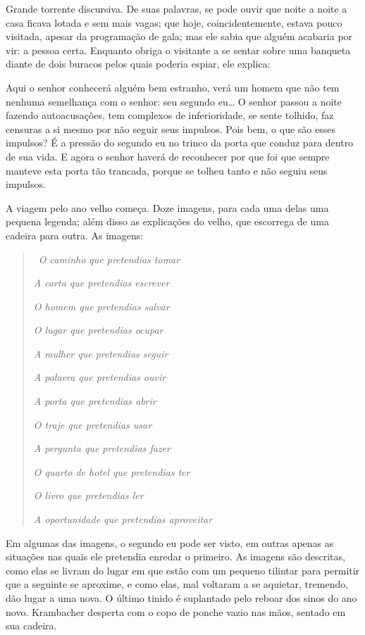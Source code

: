 Grande torrente discursiva. De suas palavras, se pode ouvir que noite a
noite a casa ficava lotada e sem mais vagas; que hoje, coincidentemente,
estava pouco visitada, apesar da programação de gala; mas ele sabia que
alguém acabaria por vir: a pessoa certa. Enquanto obriga o visitante a
se sentar sobre uma banqueta diante de dois buracos pelos quais poderia
espiar, ele explica:

Aqui o senhor conhecerá alguém bem estranho, verá um homem que não tem
nenhuma semelhança com o senhor: seu segundo eu\ldots{} O senhor passou a
noite fazendo autoacusações, tem complexos de inferioridade, se sente
tolhido, faz censuras a si mesmo por não seguir seus impulsos. Pois bem,
o que são esses impulsos? É a pressão do segundo eu no trinco da porta
que conduz para dentro de sua vida. E agora o senhor haverá de
reconhecer por que foi que sempre manteve esta porta tão trancada,
porque se tolheu tanto e não seguiu seus impulsos.

A viagem pelo ano velho começa. Doze imagens, para cada uma delas uma
pequena legenda; além disso as explicações do velho, que escorrega de
uma cadeira para outra. As imagens:

\begin{quote}
\quad\,
\emph{O caminho que pretendias tomar }

\emph{A carta que pretendias escrever }

\emph{O homem que pretendias salvar }

\emph{O lugar que pretendias ocupar }

\emph{A mulher que pretendias seguir }

\emph{A palavra que pretendias ouvir }

\emph{A porta que pretendias abrir }

\emph{O traje que pretendias usar }

\emph{A pergunta que pretendias fazer }

\emph{O quarto de hotel que pretendias ter }

\emph{O livro que pretendias ler }

\emph{A oportunidade que pretendias aproveitar }
\end{quote}

Em algumas das imagens, o segundo eu pode ser visto, em outras apenas as
situações nas quais ele pretendia enredar o primeiro. As imagens são
descritas, como elas se livram do lugar em que estão com um pequeno
tilintar para permitir que a seguinte se aproxime, e como elas, mal
voltaram a se aquietar, tremendo, dão lugar a uma nova. O último tinido
é suplantado pelo reboar dos sinos do ano novo. Krambacher desperta com
o copo de ponche vazio nas mãos, sentado em sua cadeira.

